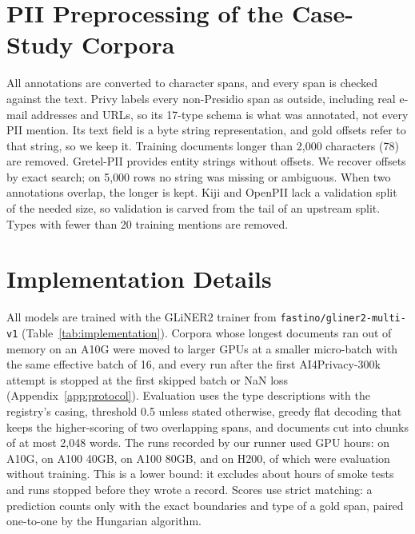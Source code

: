 \documentclass[11pt]{article}
\begin{document}
\FloatBarrier
\section{PII Preprocessing of the Case-Study Corpora}
\label{app:pii_preprocessing}

All annotations are converted to character spans, and every span is
checked against the text. Privy labels every non-Presidio span as
outside, including real e-mail addresses and URLs, so its 17-type schema
is what was annotated, not every PII mention. Its text field is a byte
string representation, and gold offsets refer to that string, so we keep
it. Training documents longer than 2{,}000 characters (78) are removed.
Gretel-PII provides entity strings without offsets. We recover offsets
by exact search; on 5{,}000 rows no string was missing or ambiguous.
When two annotations overlap, the longer is kept. Kiji and OpenPII
lack a validation split of the needed size, so validation is carved from
the tail of an upstream split. Types with fewer than 20 training mentions
are removed.

\FloatBarrier
\section{Implementation Details}
\label{app:implementation}

All models are trained with the GLiNER2 trainer from
\texttt{fastino/gliner2-multi-v1} (Table~\ref{tab:implementation}).
Corpora whose longest documents ran out of memory on an A10G were moved
to larger GPUs at a smaller micro-batch with the same effective batch
of 16, and every run after the first AI4Privacy-300k attempt is stopped
at the first skipped batch or NaN loss (Appendix~\ref{app:protocol}).
Evaluation uses the type descriptions with the registry's casing,
threshold 0.5 unless stated otherwise, greedy flat decoding that keeps
the higher-scoring of two overlapping spans, and documents cut into
chunks of at most 2{,}048 words. The  runs recorded by our runner used  GPU hours:
 on A10G,  on A100 40GB,  on A100 80GB,
and  on H200, of which  were evaluation without
training. This is a lower bound: it excludes about  hours of
smoke tests and runs stopped before they wrote a record. Scores use
strict matching: a
prediction counts only with the exact boundaries and type of a gold
span, paired one-to-one by the Hungarian algorithm.
\end{document}
